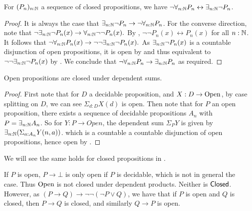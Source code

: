 \begin{lemma}\label{ClosedMarkov}
  For $(P_n)_{n:\mathbb{N}}$ a sequence of closed propositions, we have 
  $\neg \forall_{n:\mathbb{N}} P_n \leftrightarrow  \exists_{n:\mathbb{N}} \neg P_n$. 
\end{lemma}
\begin{proof}
  It is always the case that $\exists_{n:\mathbb{N}}\neg P_n \to \neg \forall_{n:\mathbb{N}} P_n$. 
  For the converse direction,
  note that $\neg \exists_{n:\mathbb{N}} \neg P_n(x) \to \forall_{n:\mathbb{N}} \neg \neg P_n(x).$
  By , $\neg \neg  P_n(x)\leftrightarrow P_n(x)$ for all $n:\mathbb{N}$. 
  It follows that 
  $\neg \forall_{n:\mathbb{N}} P_n(x)\to 
  \neg \neg \exists_{n:\mathbb{N}} \neg P_n(x).$
  As $\exists_{n:\mathbb{N}}\neg P_n(x)$ is a countable disjunction of open propositions, 
  it is open by  and thus equivalent to 
  $\neg \neg \exists_{n:\mathbb{N}} \neg P_n(x)$ by .
  We conclude that $\neg \forall_{n:\mathbb{N}} P_n \to \exists_{n:\mathbb{N}} P_n$ as required. 
\end{proof} 









\begin{lemma}\label{OpenDependentSums}
  Open propositions are closed under dependent sums.
\end{lemma}
\begin{proof}
  First note that for $D$ a decidable proposition, and $X:D \to \mathrm{Open}$,
  by case splitting on $D$, we can see 
  $\Sigma_{d:D} X(d)$ is open.
%
  Then note that for $P$ an open proposition, 
  there exists a sequence of decidable propositions $A_n$ with 
  $P = \exists_{n:\mathbb{N}} A_n $.
%
  So for $Y : P \to Open $, the dependent sum $\Sigma_P Y$ is given by 
  $\exists_{n:\mathbb{N}} (\Sigma_{a:A_n} Y(n,a))$. 
  which is a countable a countable disjunction of open propositions, 
  hence open by .
\end{proof}

We will see the same holds for closed propositions in .

\begin{remark}\label{ImplicationOpenClosed}
  If $P$ is open, $P \to \bot$ is only open if $P$ is decidable, which is not in general the case. 
  Thus $\mathrm{Open}$ is not closed under dependent products. Neither is $\mathsf{Closed}$. 
  However, as $(P\to Q)  \to \neg \neg (\neg P \vee Q)$,
  we have that if $P$ is open and $Q$ is closed, then $P\to Q$ is closed, and similarly $Q\to P$ is open.
\end{remark}
